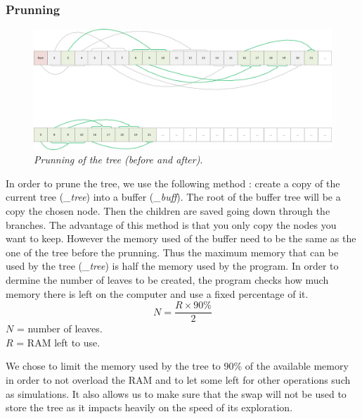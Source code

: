 \subsubsection{Prunning}
\begin{figure}[H] 
\centerline{\includegraphics[width=\textwidth]{Data_Structure/Img/array.png}}
\caption{\label{fig:arrayprunning}\textit{Prunning of the tree (before and after)}.}
\end{figure}
In order to prune the tree, we use the following method : create a copy of the current tree (\textit{\_tree}) into a buffer (\textit{\_buff}). The root of the buffer tree will be a copy the chosen node. Then the children are saved going down through the branches. The advantage of this method is that you only copy the nodes you want to keep. However the memory used of the buffer need to be the same as the one of the tree before the prunning. Thus the maximum memory that can be used by the tree (\textit{\_tree}) is half the memory used by the program. In order to dermine the number of leaves to be created, the program checks how much memory there is left on the computer and use a fixed percentage of it.
\begin{equation}
N = \frac{R \times 90\%}{2}
\end{equation}
\ensuremath{N} = number of leaves.\\
\ensuremath{R} = RAM left to use.

We chose to limit the memory used by the tree to 90\% of the available memory in order to not overload the RAM and to let some left for other operations such as simulations. It also allows us to make sure that the swap will not be used to store the tree as it impacts heavily on the speed of its exploration.

